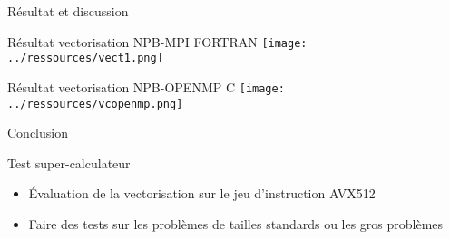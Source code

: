 \documentclass{beamer}
\begin{document}
\begin{frame}{Résultat et discussion}

  \begin{block}{Résultat vectorisation NPB-MPI FORTRAN}
    \texttt{[image: ../ressources/vect1.png]}
  \end{block}
  
  \begin{block}{Résultat vectorisation NPB-OPENMP C}
    \texttt{[image: ../ressources/vcopenmp.png]}
  \end{block}

\end{frame}

\begin{frame}{ Conclusion}

  \begin{block}{Test super-calculateur}
    \begin{itemize}
    \item Évaluation de la vectorisation sur le jeu d'instruction AVX512
    \item Faire des tests sur les problèmes de tailles standards ou les gros problèmes
    \end{itemize}
  \end{block}
  
\end{frame}
\end{document}

